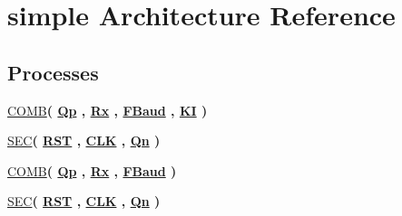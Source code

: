 \hypertarget{class_f_s_m_read_1_1simple}{}\section{simple Architecture Reference}
\label{class_f_s_m_read_1_1simple}
\subsection*{Processes}
 \begin{DoxyCompactItemize}
\item 
\hyperlink{class_f_s_m_read_1_1simple_ace19973db30808299e3e4606a0e15f13}{C\+O\+M\+B}{\bfseries  ( {\bfseries {\bfseries \hyperlink{class_f_s_m_read_1_1simple_abf527e5ab705b833ba9cb4b73c5721c7}{Qp}} \textcolor{vhdlchar}{ }} , {\bfseries {\bfseries \hyperlink{class_f_s_m_read_a5b7b5dfa3fdd403b397fc3a20f75ec69}{Rx}} \textcolor{vhdlchar}{ }} , {\bfseries {\bfseries \hyperlink{class_f_s_m_read_af29ebfe43178ab3fe4bfeb0538c18d1f}{F\+Baud}} \textcolor{vhdlchar}{ }} , {\bfseries {\bfseries \hyperlink{class_f_s_m_read_a97c032966a659a6a0d6d0b7ff63752eb}{K\+I}} \textcolor{vhdlchar}{ }} )}
\item 
\hyperlink{class_f_s_m_read_1_1simple_ab8db662ccfd43b408e594140beb223d2}{S\+E\+C}{\bfseries  ( {\bfseries {\bfseries \hyperlink{class_f_s_m_read_a98682ef7de2714e5bab788a2e2ff1b7f}{R\+S\+T}} \textcolor{vhdlchar}{ }} , {\bfseries {\bfseries \hyperlink{class_f_s_m_read_ab5d0ea9e968d49d94da9db07a979d402}{C\+L\+K}} \textcolor{vhdlchar}{ }} , {\bfseries {\bfseries \hyperlink{class_f_s_m_read_1_1simple_a7a44fa5330ac293b382a610b0cf6937b}{Qn}} \textcolor{vhdlchar}{ }} )}
\item 
\hyperlink{class_f_s_m_read_1_1simple_a6c702b594223712d390178262bbd44b4}{C\+O\+M\+B}{\bfseries  ( {\bfseries {\bfseries \hyperlink{class_f_s_m_read_1_1simple_abf527e5ab705b833ba9cb4b73c5721c7}{Qp}} \textcolor{vhdlchar}{ }} , {\bfseries {\bfseries \hyperlink{class_f_s_m_read_a5b7b5dfa3fdd403b397fc3a20f75ec69}{Rx}} \textcolor{vhdlchar}{ }} , {\bfseries {\bfseries \hyperlink{class_f_s_m_read_af29ebfe43178ab3fe4bfeb0538c18d1f}{F\+Baud}} \textcolor{vhdlchar}{ }} )}
\item 
\hyperlink{class_f_s_m_read_1_1simple_ab8db662ccfd43b408e594140beb223d2}{S\+E\+C}{\bfseries  ( {\bfseries {\bfseries \hyperlink{class_f_s_m_read_a98682ef7de2714e5bab788a2e2ff1b7f}{R\+S\+T}} \textcolor{vhdlchar}{ }} , {\bfseries {\bfseries \hyperlink{class_f_s_m_read_ab5d0ea9e968d49d94da9db07a979d402}{C\+L\+K}} \textcolor{vhdlchar}{ }} , {\bfseries {\bfseries \hyperlink{class_f_s_m_read_1_1simple_a7a44fa5330ac293b382a610b0cf6937b}{Qn}} \textcolor{vhdlchar}{ }} )}
\end{DoxyCompactItemize}
